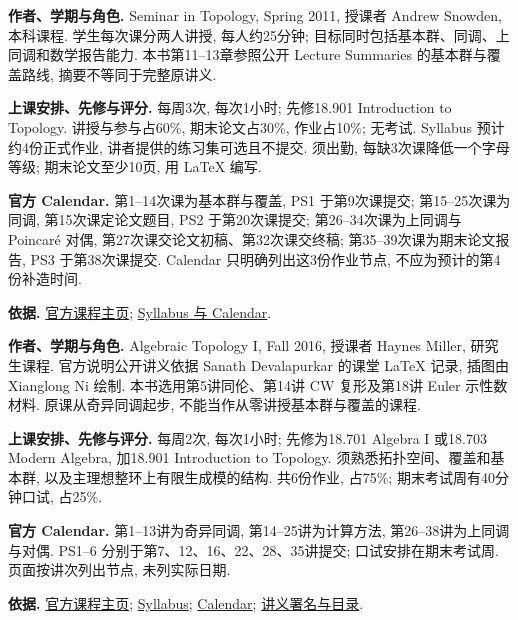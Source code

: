 \textbf{作者、学期与角色.} Seminar in Topology, Spring 2011, 授课者 Andrew Snowden, 本科课程. 学生每次课分两人讲授, 每人约25分钟; 目标同时包括基本群、同调、上同调和数学报告能力. 本书第11--13章参照公开 Lecture Summaries 的基本群与覆盖路线, 摘要不等同于完整原讲义.

\textbf{上课安排、先修与评分.} 每周3次, 每次1小时; 先修18.901 Introduction to Topology. 讲授与参与占60\%, 期末论文占30\%, 作业占10\%; 无考试. Syllabus 预计约4份正式作业, 讲者提供的练习集可选且不提交. 须出勤, 每缺3次课降低一个字母等级; 期末论文至少10页, 用 LaTeX 编写.

\textbf{官方 Calendar.} 第1--14次课为基本群与覆盖, PS1 于第9次课提交; 第15--25次课为同调, 第15次课定论文题目, PS2 于第20次课提交; 第26--34次课为上同调与 Poincar\'e 对偶, 第27次课交论文初稿、第32次课交终稿; 第35--39次课为期末论文报告, PS3 于第38次课提交. Calendar 只明确列出这3份作业节点, 不应为预计的第4份补造时间.

\textbf{依据.} \href{https://ocw.mit.edu/courses/18-904-seminar-in-topology-spring-2011/}{官方课程主页}; \href{https://ocw.mit.edu/courses/18-904-seminar-in-topology-spring-2011/pages/syllabus/}{Syllabus 与 Calendar}.

\par\addvspace{9pt}
\par\nobreak\vspace{4pt}

\textbf{作者、学期与角色.} Algebraic Topology I, Fall 2016, 授课者 Haynes Miller, 研究生课程. 官方说明公开讲义依据 Sanath Devalapurkar 的课堂 LaTeX 记录, 插图由 Xianglong Ni 绘制. 本书选用第5讲同伦、第14讲 CW 复形及第18讲 Euler 示性数材料. 原课从奇异同调起步, 不能当作从零讲授基本群与覆盖的课程.

\textbf{上课安排、先修与评分.} 每周2次, 每次1小时; 先修为18.701 Algebra I 或18.703 Modern Algebra, 加18.901 Introduction to Topology. 须熟悉拓扑空间、覆盖和基本群, 以及主理想整环上有限生成模的结构. 共6份作业, 占75\%; 期末考试周有40分钟口试, 占25\%.

\textbf{官方 Calendar.} 第1--13讲为奇异同调, 第14--25讲为计算方法, 第26--38讲为上同调与对偶. PS1--6 分别于第7、12、16、22、28、35讲提交; 口试安排在期末考试周. 页面按讲次列出节点, 未列实际日期.

\textbf{依据.} \href{https://ocw.mit.edu/courses/18-905-algebraic-topology-i-fall-2016/}{官方课程主页}; \href{https://ocw.mit.edu/courses/18-905-algebraic-topology-i-fall-2016/pages/syllabus/}{Syllabus}; \href{https://ocw.mit.edu/courses/18-905-algebraic-topology-i-fall-2016/pages/calendar/}{Calendar}; \href{https://ocw.mit.edu/courses/18-905-algebraic-topology-i-fall-2016/pages/lecture-notes/}{讲义署名与目录}.

